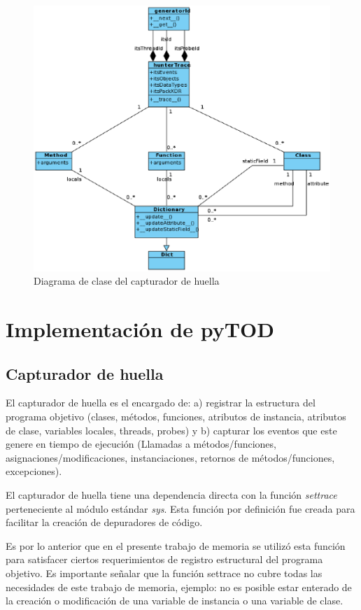 \documentclass[12pt,legalpaper]{report}
\begin{document}
\begin{figure}[hpb]
	\centering
	\includegraphics[scale=0.6]{images/classModelHunterTrace.eps}
	\caption{Diagrama de clase del capturador de huella}
\end{figure}
	
	
	\section{Implementación de pyTOD}
		\subsection{Capturador de huella}
		
El capturador de huella es el encargado de: a) registrar la estructura del programa objetivo (clases, métodos, funciones, atributos de instancia, atributos de clase, variables locales, threads, probes) y b) capturar los eventos que este genere en tiempo de ejecución (Llamadas a métodos/funciones, asignaciones/modificaciones, instanciaciones, retornos de métodos/funciones, excepciones). 

El capturador de huella tiene una dependencia directa con la función \textit{settrace} \cite{settrace} perteneciente al módulo estándar \textit{sys}.  Esta función por definición fue creada para facilitar la creación de depuradores de código.

Es por lo anterior que en el presente trabajo de memoria se utilizó esta función para satisfacer ciertos requerimientos de registro estructural del programa objetivo.  Es importante señalar que la función settrace no cubre todas las necesidades de este trabajo de memoria, ejemplo: no es posible estar enterado de la creación o modificación de una variable de instancia o una variable de clase.
\end{document}
